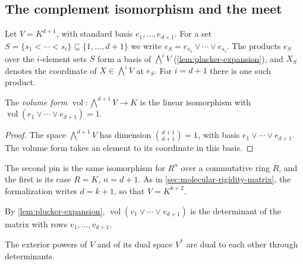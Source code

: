 \subsection{The complement isomorphism and the meet}

Let $V = K^{d+1}$, with standard basis $e_1, \dots, e_{d+1}$. For a set
$S = \{s_1 < \cdots < s_i\} \subseteq \{1, \dots, d+1\}$ we write
$e_S = e_{s_1} \vee \cdots \vee e_{s_i}$. The products $e_S$ over the
$i$-element sets $S$ form a basis of $\bigwedge^i V$
(\cref{lem:plucker-expansion}), and $X_S$ denotes the coordinate of
$X \in \bigwedge^i V$ at $e_S$. For $i = d+1$ there is one such product.

\begin{definition}
  \label{def:meet-top-equiv}
  \leanok
  The \emph{volume form}
  $\operatorname{vol} \colon \bigwedge^{d+1} V \to K$ is the linear
  isomorphism with $\operatorname{vol}(e_1 \vee \cdots \vee e_{d+1}) = 1$.
\end{definition}
\begin{proof}
  \leanok
  The space $\bigwedge^{d+1} V$ has dimension $\binom{d+1}{d+1} = 1$,
  with basis $e_1 \vee \cdots \vee e_{d+1}$. The volume form takes an
  element to its coordinate in this basis.
\end{proof}
\begin{fmlnote}
  The second pin is the same isomorphism for $R^n$ over a commutative
  ring $R$, and the first is its case $R = K$, $n = d+1$. As in
  \cref{sec:molecular-rigidity-matrix}, the formalization writes
  $d = k + 1$, so that $V = K^{k+2}$.
\end{fmlnote}

By \cref{lem:plucker-expansion},
$\operatorname{vol}(v_1 \vee \cdots \vee v_{d+1})$ is the determinant of
the matrix with rows $v_1, \dots, v_{d+1}$.

The exterior powers of $V$ and of its dual space $V^*$ are dual to each
other through determinants.

